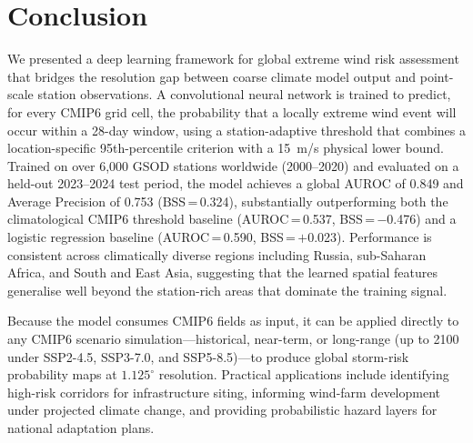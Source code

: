\documentclass{article}
\begin{document}

\section{Conclusion}
\label{sec:conclusion}

We presented a deep learning framework for global extreme wind risk assessment that bridges the resolution gap between coarse climate model output and point-scale station observations. A convolutional neural network is trained to predict, for every CMIP6 grid cell, the probability that a locally extreme wind event will occur within a 28-day window, using a station-adaptive threshold that combines a location-specific 95th-percentile criterion with a 15~m/s physical lower bound. Trained on over 6{,}000 GSOD stations worldwide (2000--2020) and evaluated on a held-out 2023--2024 test period, the model achieves a global AUROC of 0.849 and Average Precision of 0.753 (BSS\,=\,0.324), substantially outperforming both the climatological CMIP6 threshold baseline (AUROC\,=\,0.537, BSS\,=\,$-$0.476) and a logistic regression baseline (AUROC\,=\,0.590, BSS\,=\,$+$0.023). Performance is consistent across climatically diverse regions including Russia, sub-Saharan Africa, and South and East Asia, suggesting that the learned spatial features generalise well beyond the station-rich areas that dominate the training signal.

Because the model consumes CMIP6 fields as input, it can be applied directly to any CMIP6 scenario simulation---historical, near-term, or long-range (up to 2100 under SSP2-4.5, SSP3-7.0, and SSP5-8.5)---to produce global storm-risk probability maps at $1.125^\circ$ resolution. Practical applications include identifying high-risk corridors for infrastructure siting, informing wind-farm development under projected climate change, and providing probabilistic hazard layers for national adaptation plans.
\end{document}

